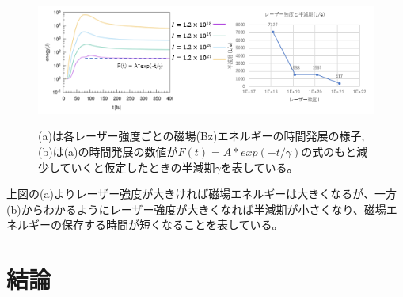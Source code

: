 \documentclass[a4paper,11pt,titlepage]{jarticle}
\numberwithin{equation}{section} %
\begin{document}
  \begin{figure}[H]
    \begin{center}
      \includegraphics[scale=1.1]{./image/4-25-10rod.png}
      \label{fig:4-4-17}
      \caption{(a)は各レーザー強度ごとの磁場(Bz)エネルギーの時間発展の様子,(b)は(a)の時間発展の数値が$F(t)= A* exp(-t / \gamma)$の式のもと減少していくと仮定したときの半減期$\gamma$を表している。}
    \end{center}
  \end{figure}
  
  上図の(a)よりレーザー強度が大きければ磁場エネルギーは大きくなるが、一方(b)からわかるようにレーザー強度が大きくなれば半減期が小さくなり、磁場エネルギーの保存する時間が短くなることを表している。
  



\section{結論}
\end{document}
